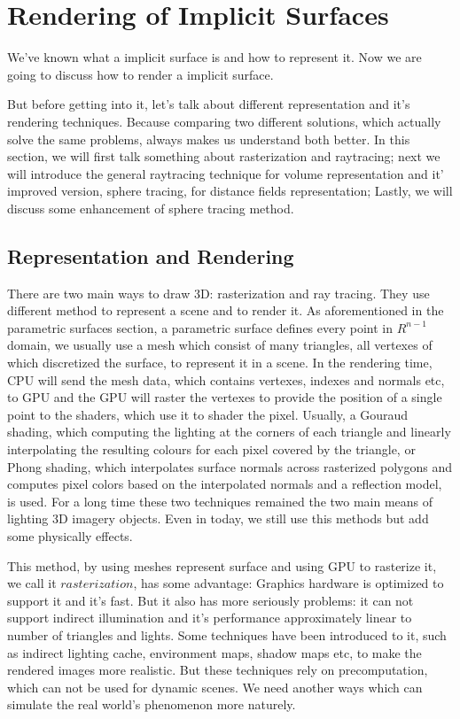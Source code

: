 \chapter{Rendering of Implicit Surfaces}\label{s:rendering-of-implicit-surfaces}
We've known what a implicit surface is and how to represent it. Now we are going to discuss how to render a implicit surface. 

But before getting into it, let's talk about different representation and it's rendering techniques. Because comparing two different solutions, which actually solve the same problems, always makes us understand both better. In this section, we will first talk something about rasterization and raytracing; next we will introduce the general raytracing technique for volume representation and it' improved version, sphere tracing, for distance fields representation; Lastly, we will discuss some enhancement of sphere tracing method. 


\section{Representation and Rendering}
There are two main ways to draw 3D: rasterization and ray tracing. They use different method to represent a scene and to render it. As aforementioned in the parametric surfaces section, a parametric surface defines every point in $R^{n-1}$ domain, we usually use a mesh which consist of many triangles, all vertexes of which discretized the surface, to represent it in a scene. In the rendering time, CPU will send the mesh data, which contains vertexes, indexes and normals etc, to GPU and the GPU will raster the vertexes to provide the position of a single point to the shaders, which use it to shader the pixel. Usually, a Gouraud shading, which computing the lighting at the corners of each triangle and linearly interpolating the resulting colours for each pixel covered by the triangle, or Phong shading, which interpolates surface normals across rasterized polygons and computes pixel colors based on the interpolated normals and a reflection model, is used. For a long time these two techniques remained the two main means of lighting 3D imagery objects. Even in today, we still use this methods but add some physically effects.

This method, by using meshes represent surface and using GPU to rasterize it, we call it $rasterization$, has some advantage: Graphics hardware is optimized to support it and it's fast. But it also has more seriously problems: it can not support indirect illumination and it's performance approximately linear to number of triangles and lights. Some techniques have been introduced to it, such as indirect lighting cache, environment maps, shadow maps etc, to make the rendered images more realistic. But these techniques rely on precomputation, which can not be used for dynamic scenes. We need another ways which can simulate the real world's phenomenon more naturely.  

